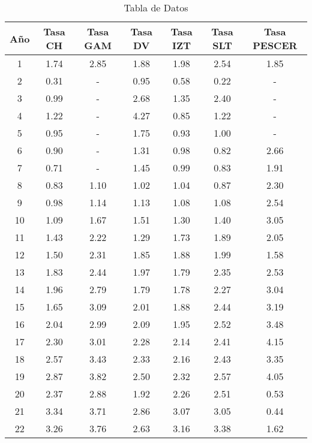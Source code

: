 \documentclass[12pt]{article}
\begin{document}
\begin{table}
\centering
\begin{tabular}{|c|c|c|c|c|c|c|}
\hline
Año & Tasa CH & Tasa GAM & Tasa DV & Tasa IZT & Tasa SLT & Tasa PESCER \\
\hline
1 & 1.74 & 2.85 & 1.88 & 1.98 & 2.54 & 1.85 \\
2 & 0.31 & - & 0.95 & 0.58 & 0.22 & - \\
3 & 0.99 & - & 2.68 & 1.35 & 2.40 & - \\
4 & 1.22 & - & 4.27 & 0.85 & 1.22 & - \\
5 & 0.95 & - & 1.75 & 0.93 & 1.00 & - \\
6 & 0.90 & - & 1.31 & 0.98 & 0.82 & 2.66 \\
7 & 0.71 & - & 1.45 & 0.99 & 0.83 & 1.91 \\
8 & 0.83 & 1.10 & 1.02 & 1.04 & 0.87 & 2.30 \\
9 & 0.98 & 1.14 & 1.13 & 1.08 & 1.08 & 2.54 \\
10 & 1.09 & 1.67 & 1.51 & 1.30 & 1.40 & 3.05 \\
11 & 1.43 & 2.22 & 1.29 & 1.73 & 1.89 & 2.05 \\
12 & 1.50 & 2.31 & 1.85 & 1.88 & 1.99 & 1.58 \\
13 & 1.83 & 2.44 & 1.97 & 1.79 & 2.35 & 2.53 \\
14 & 1.96 & 2.79 & 1.79 & 1.78 & 2.27 & 3.04 \\
15 & 1.65 & 3.09 & 2.01 & 1.88 & 2.44 & 3.19 \\
16 & 2.04 & 2.99 & 2.09 & 1.95 & 2.52 & 3.48 \\
17 & 2.30 & 3.01 & 2.28 & 2.14 & 2.41 & 4.15 \\
18 & 2.57 & 3.43 & 2.33 & 2.16 & 2.43 & 3.35 \\
19 & 2.87 & 3.82 & 2.50 & 2.32 & 2.57 & 4.05 \\
20 & 2.37 & 2.88 & 1.92 & 2.26 & 2.51 & 0.53 \\
21 & 3.34 & 3.71 & 2.86 & 3.07 & 3.05 & 0.44 \\
22 & 3.26 & 3.76 & 2.63 & 3.16 & 3.38 & 1.62 \\
\hline
\end{tabular}
\caption{Tabla de Datos}
\label{tab:datos4}
\end{table}
\end{document}
